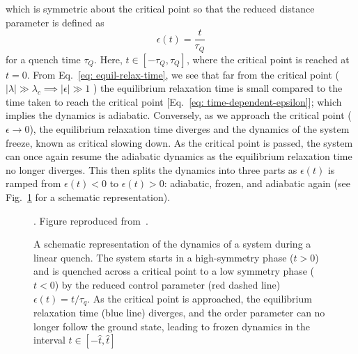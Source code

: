 which is symmetric about the critical point so that the reduced distance
parameter is defined as
\begin{equation}
    \epsilon(t) = \frac{t}{\tau_Q}
    \label{eq: time-dependent-epsilon}
\end{equation}
for a quench time $\tau_Q$.
Here, $t \in [-\tau_Q, \tau_Q]$, where the critical point is reached at $t=0$.
From Eq.~\eqref{eq: equil-relax-time}, we see that far from the critical point
($|\lambda| \gg \lambda_c \implies |\epsilon| \gg 1$ ) the equilibrium
relaxation time is small compared to the time taken to reach the critical point
[Eq.~\eqref{eq: time-dependent-epsilon}]; which implies the dynamics is
adiabatic.
Conversely, as we approach the critical point ($\epsilon \rightarrow 0$), the
equilibrium relaxation time diverges and the dynamics of the system freeze,
known as critical slowing down.
As the critical point is passed, the system can once again resume the adiabatic
dynamics as the equilibrium relaxation time no longer diverges.
This then splits the dynamics into three parts as $\epsilon(t)$ is ramped from
$\epsilon(t) < 0 $ to $\epsilon(t) > 0$: adiabatic, frozen, and adiabatic again
(see Fig.~\ref{fig: adiabatic-impulse} for a schematic representation).
\begin{figure}
    \centering
    \caption{A schematic representation of the dynamics of a system during a
    linear quench. The system starts in a high-symmetry phase ($t>0$) and is
    quenched across a critical point to a low symmetry phase ($t < 0$) by the
    reduced control parameter (red dashed line) $\epsilon(t)=t/\tau_q$. As
    the critical point is approached, the equilibrium relaxation time
    (blue line) diverges, and the order parameter can no longer follow the 
    ground state, leading to frozen dynamics in the interval
    $t \in [-\hat{t}, \hat{t}]$}. Figure reproduced from~\cite{delCampo2013}.
    \label{fig: adiabatic-impulse}
\end{figure}

